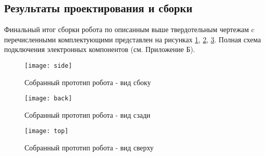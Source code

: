 \subsection{Результаты проектирования и сборки}\label{C4_4_5}

Финальный итог сборки робота по описанным выше твердотельным чертежам c перечисленными комплектующими представлен на  рисунках \ref{side}, \ref{back}, \ref{top}. Полная схема подключения электронных компонентов (см. Приложение Б).
\newpage
\begin{figure}[h!]
	\begin{center}
		\texttt{[image: side]}
		\caption{Собранный прототип робота - вид сбоку}
		\label{side}
	\end{center}
\end{figure}

\begin{figure}[h!]
	\begin{center}
		\texttt{[image: back]}
		\caption{Собранный прототип робота - вид сзади}
		\label{back}
	\end{center}
\end{figure}
\newpage
\begin{figure}[h!]
	\begin{center}
		\texttt{[image: top]}
		\caption{Собранный прототип робота - вид сверху}
		\label{top}
	\end{center}
\end{figure}